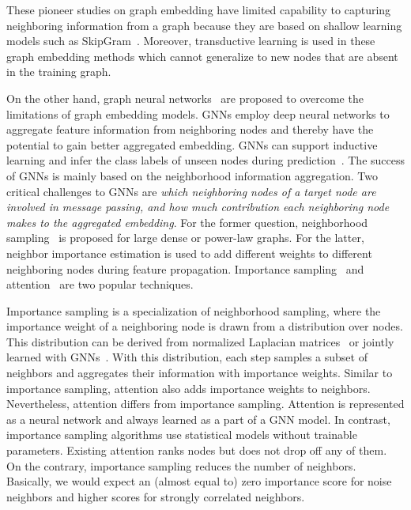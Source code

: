 \documentclass[sigconf]{acmart}
\begin{document}
These pioneer studies on graph embedding have limited capability to capturing neighboring information from a graph because they are based on shallow learning models such as SkipGram~\cite{mikolov2013distributed}.
Moreover, transductive learning is used in these graph embedding methods which cannot generalize to new nodes that are absent in the training graph.

On the other hand, graph neural networks~\cite{kipf2016semi, hamilton2017inductive, velivckovic2017graph} are proposed to overcome the limitations of graph embedding models.
GNNs employ deep neural networks to aggregate feature information from neighboring nodes and thereby have the potential to gain better aggregated embedding.
GNNs can support inductive learning and infer the class labels of unseen nodes during prediction~\cite{hamilton2017inductive, velivckovic2017graph}.
The success of GNNs is mainly based on the neighborhood information aggregation.
Two critical challenges to GNNs are \textit{which neighboring nodes of a target node are involved in message passing, and how much contribution each neighboring node makes to the aggregated embedding}.
For the former question, neighborhood sampling~\cite{hamilton2017inductive, ying2018graph, chen2018fastgcn, huang2018adaptive, zou2019layer, ji2020accelerating} is proposed for large dense or power-law graphs.
For the latter, neighbor importance estimation is used to add different weights to different neighboring nodes during feature propagation.
Importance sampling~\cite{chen2018fastgcn, zou2019layer, ji2020accelerating} and attention~\cite{velivckovic2017graph,liu2019geniepath, wang2019heterogeneous, yun2019graph, hu2020heterogeneous} are two popular techniques.

Importance sampling is a specialization of neighborhood sampling, where the importance weight of a neighboring node is drawn from a distribution over nodes.
This distribution can be derived from normalized Laplacian matrices~\cite{chen2018fastgcn, zou2019layer} or jointly learned with GNNs~\cite{ji2020accelerating}.
With this distribution, each step samples a subset of neighbors and aggregates their information with importance weights.
Similar to importance sampling, attention also adds importance weights to neighbors.
Nevertheless, attention differs from importance sampling.
Attention is represented as a neural network and always learned as a part of a GNN model.
In contrast, importance sampling algorithms use statistical models without trainable parameters.
Existing attention ranks nodes but does not drop off any of them. On the contrary, importance sampling reduces the number of neighbors.
Basically, we would expect an (almost equal to) zero importance score for noise neighbors and higher scores for strongly correlated neighbors.
\end{document}
